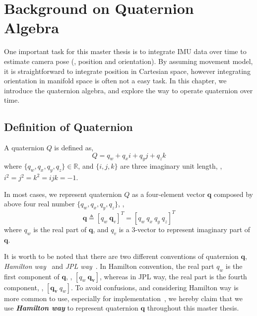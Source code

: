 \chapter{Background on Quaternion Algebra}
\label{chap:background}

One important task for this master thesis is to integrate IMU data over time to estimate camera pose (\eg, position and orientation). By assuming movement model, it is straightforward to integrate position in Cartesian space, however integrating orientation in manifold space is often not a easy task. In this chapter, we introduce the quaternion algebra, and explore the way to operate quaternion over time.

\section{Definition of Quaternion}
\label{sec:def_of_quat}

A quaternion $Q$ is defined as,
\begin{equation}\label{q1}
	Q = q_w + q_xi + q_yj + q_zk
\end{equation}
where $\{q_w,q_x,q_y,q_z\} \in \mathbb{R}$, and $\{i,j,k\}$ are three imaginary unit length, \eg, $i^2=j^2=k^2=ijk=-1$.

In most cases, we represent quaternion $Q$ as a four-element vector $\textbf{q}$ composed by above four real number $\{q_w,q_x,q_y,q_z\}$, \ie,
\begin{equation}\label{q2}
	\mathbf{q} \triangleq \left[q_w \ \mathbf{q}_v\right]^T = \left[q_w \ q_x \ q_y \ q_z \right]^T
\end{equation}
where $q_w$ is the real part of $\textbf{q}$, and $q_v$ is a 3-vector to represent imaginary part of $\textbf{q}$. 

It is worth to be noted that there are two different conventions of quaternion $\textbf{q}$, \textit{Hamilton way}~\cite{hamilton1844ii} and \textit{JPL way}~\cite{breckenridge1999quaternions}. In Hamilton convention, the real part $q_w$ is the first component of $\textbf{q}$, \ie, $\left[q_w \ \mathbf{q_v}\right]$, whereas in JPL way, the real part is the fourth component, \ie, $\left[\mathbf{q_v} \ q_w\right]$. To avoid confusions, and considering Hamilton way is more common to use, especially for implementation~\cite{guennebaud2010eigen, hess2007essential}, we hereby claim that we use \textbf{\textit{Hamilton way}} to represent quaternion $\textbf{q}$ throughout this master thesis. 

